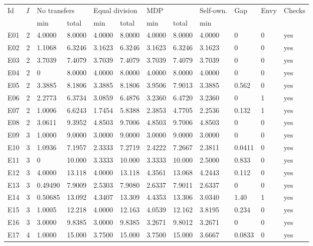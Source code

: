 {\scriptsize\setlength{\tabcolsep}{3pt}
\begin{longtable}{@{}llllllllllll@{}}
\toprule
Id & $I$ & \multicolumn{2}{l}{No transfers} & \multicolumn{2}{l}{Equal division} & \multicolumn{2}{l}{MDP} & Self-own. & Gap & Envy & Checks \\
 & & min & total & min & total & min & total & min & & & \\
\midrule\endhead
\bottomrule\endfoot
E01 & 2 & 4.0000 & 8.0000 & 4.0000 & 8.0000 & 4.0000 & 8.0000 & 4.0000 & 0 & 0 & yes \\
E02 & 2 & 1.1068 & 6.3246 & 3.1623 & 6.3246 & 3.1623 & 6.3246 & 3.1623 & 0 & 0 & yes \\
E03 & 2 & 3.7039 & 7.4079 & 3.7039 & 7.4079 & 3.7039 & 7.4079 & 3.7039 & 0 & 0 & yes \\
E04 & 2 & 0 & 8.0000 & 4.0000 & 8.0000 & 4.0000 & 8.0000 & 4.0000 & 0 & 0 & yes \\
E05 & 2 & 3.3885 & 8.1806 & 3.3885 & 8.1806 & 3.9506 & 7.9013 & 3.3885 & 0.562 & 0 & yes \\
E06 & 2 & 2.2773 & 6.3734 & 3.0859 & 6.4876 & 3.2360 & 6.4720 & 3.2360 & 0 & 1 & yes \\
E07 & 2 & 1.0006 & 6.6243 & 1.7454 & 5.8388 & 2.3853 & 4.7705 & 2.2536 & 0.132 & 1 & yes \\
E08 & 2 & 3.0611 & 9.3952 & 4.8503 & 9.7006 & 4.8503 & 9.7006 & 4.8503 & 0 & 0 & yes \\
E09 & 3 & 1.0000 & 9.0000 & 3.0000 & 9.0000 & 3.0000 & 9.0000 & 3.0000 & 0 & 0 & yes \\
E10 & 3 & 1.0936 & 7.1957 & 2.3333 & 7.2719 & 2.4222 & 7.2667 & 2.3811 & 0.0411 & 0 & yes \\
E11 & 3 & 0 & 10.000 & 3.3333 & 10.000 & 3.3333 & 10.000 & 2.5000 & 0.833 & 0 & yes \\
E12 & 3 & 4.0000 & 13.118 & 4.0000 & 13.118 & 4.3561 & 13.068 & 4.2443 & 0.112 & 0 & yes \\
E13 & 3 & 0.49490 & 7.9009 & 2.5303 & 7.9080 & 2.6337 & 7.9011 & 2.6337 & 0 & 0 & yes \\
E14 & 3 & 0.50685 & 13.092 & 4.3407 & 13.309 & 4.4353 & 13.306 & 3.0340 & 1.40 & 1 & yes \\
E15 & 3 & 1.0005 & 12.218 & 4.0000 & 12.163 & 4.0539 & 12.162 & 3.8195 & 0.234 & 0 & yes \\
E16 & 3 & 3.0000 & 9.8385 & 3.0000 & 9.8385 & 3.2671 & 9.8012 & 3.2671 & 0 & 0 & yes \\
E17 & 4 & 1.0000 & 15.000 & 3.7500 & 15.000 & 3.7500 & 15.000 & 3.6667 & 0.0833 & 0 & yes \\

\end{longtable}}
